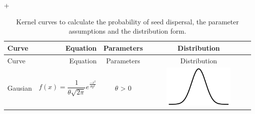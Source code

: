 +\documentclass[12pt]{article}
\begin{document}
\begin{longtable}[]{@{}lrcc@{}}
\caption{Kernel curves to calculate the probability of seed dispersal,
the parameter assumptions and the distribution form.
\label{tbl:eq}}\tabularnewline
\toprule
\begin{minipage}[b]{0.17\columnwidth}\raggedright\strut
Curve\strut
\end{minipage} & \begin{minipage}[b]{0.15\columnwidth}\raggedleft\strut
Equation\strut
\end{minipage} & \begin{minipage}[b]{0.16\columnwidth}\centering\strut
Parameters\strut
\end{minipage} & \begin{minipage}[b]{0.18\columnwidth}\centering\strut
Distribution\strut
\end{minipage}\tabularnewline
\midrule
\endfirsthead
\toprule
\begin{minipage}[b]{0.17\columnwidth}\raggedright\strut
Curve\strut
\end{minipage} & \begin{minipage}[b]{0.15\columnwidth}\raggedleft\strut
Equation\strut
\end{minipage} & \begin{minipage}[b]{0.16\columnwidth}\centering\strut
Parameters\strut
\end{minipage} & \begin{minipage}[b]{0.18\columnwidth}\centering\strut
Distribution\strut
\end{minipage}\tabularnewline
\midrule
\endhead
\begin{minipage}[t]{0.17\columnwidth}\raggedright\strut
Gausian\strut
\end{minipage} & \begin{minipage}[t]{0.15\columnwidth}\raggedleft\strut
\[ f(x) = \frac{1}{\theta\sqrt{2\pi}} e^{\frac{-x^2}{\theta y^2}} \]\strut
\end{minipage} & \begin{minipage}[t]{0.16\columnwidth}\centering\strut
\(\theta\) \textgreater{} 0\strut
\end{minipage} & \begin{minipage}[t]{0.18\columnwidth}\centering\strut
\includegraphics[width=0.65000\textwidth]{figure/gaussian.pdf}\strut

\end{minipage}
\end{longtable}
\end{document}
